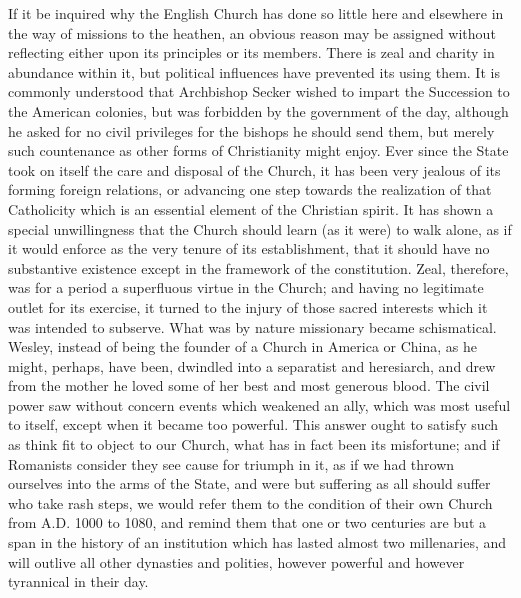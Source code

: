 If it be
inquired why the English Church has done so little here and elsewhere in
the way of missions to the heathen, an obvious reason may be assigned
without reflecting either upon its principles or its members. There is
zeal and charity in abundance within it, but political influences have
prevented its using them. It is commonly understood that Archbishop
Secker wished to impart the Succession to the American colonies, but was
forbidden by the government of the day, although he asked for no civil
privileges for the bishops he should send them, but merely such
countenance as other forms of Christianity might enjoy. Ever since the
State took on itself the care and disposal of the Church, it has been
very jealous of its forming foreign relations, or advancing one step
towards the realization of that Catholicity which is an essential
element of the Christian spirit. It has shown a special unwillingness
that the Church should learn (as it were) to walk alone, as if it would
enforce as the very tenure of its establishment, that it should have no
substantive existence except in the framework of the constitution. Zeal,
therefore, was for a period a superfluous virtue in the Church; and
having no legitimate outlet for its exercise, it turned to the injury of
those sacred interests which it was intended to subserve. What was by
nature missionary became schismatical. Wesley, instead of being the
founder of a Church in America or China, as he might, perhaps, have
been, dwindled into a separatist and heresiarch, and drew from the
mother he loved some of her best and most generous blood. The civil
power saw without concern events which weakened an ally, which was most
useful to itself, except when it became too powerful. This answer
ought to satisfy such as think fit to object to our Church, what has in
fact been its misfortune; and if Romanists consider they see cause for
triumph in it, as if we had thrown ourselves into the arms of the State,
and were but suffering as all should suffer who take rash steps, we
would refer them to the condition of their own Church from A.D.
1000 to 1080, and remind them that one or two centuries are but a span
in the history of an institution which has lasted almost two
millenaries, and will outlive all other dynasties and polities, however
powerful and however tyrannical in their day.


